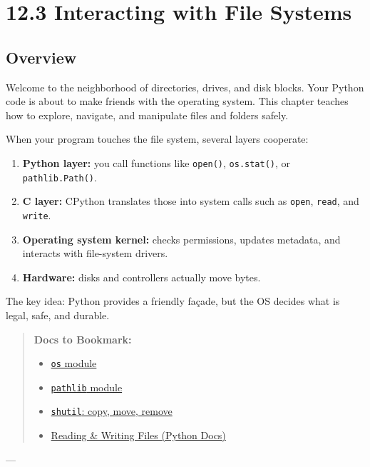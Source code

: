 \chapter{12.3 Interacting with File Systems}

\section*{Overview}

Welcome to the neighborhood of directories, drives, and disk blocks.
Your Python code is about to make friends with the operating system.
This chapter teaches how to explore, navigate, and manipulate files and folders safely.

When your program touches the file system, several layers cooperate:

\begin{enumerate}
  \item \textbf{Python layer:} you call functions like \texttt{open()}, \texttt{os.stat()}, or \texttt{pathlib.Path()}.
  \item \textbf{C layer:} CPython translates those into system calls such as \texttt{open}, \texttt{read}, and \texttt{write}.
  \item \textbf{Operating system kernel:} checks permissions, updates metadata, and interacts with file-system drivers.
  \item \textbf{Hardware:} disks and controllers actually move bytes.
\end{enumerate}

The key idea: Python provides a friendly façade, but the OS decides what is legal, safe, and durable.

\begin{quote}
\textbf{Docs to Bookmark:}
\begin{itemize}
  \item \href{https://docs.python.org/3/library/os.html}{\texttt{os} module}
  \item \href{https://docs.python.org/3/library/pathlib.html}{\texttt{pathlib} module}
  \item \href{https://docs.python.org/3/library/shutil.html}{\texttt{shutil}: copy, move, remove}
  \item \href{https://docs.python.org/3/tutorial/inputoutput.html#reading-and-writing-files}{Reading \& Writing Files (Python Docs)}
\end{itemize}
\end{quote}

---

